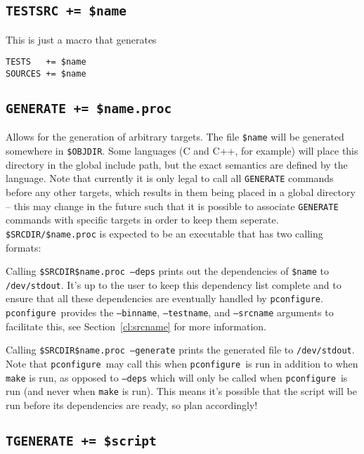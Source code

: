\documentclass{article}
\newcommand{\pconfigure}{\texttt{pconfigure}}
\begin{document}
\subsection{\texttt{TESTSRC += \$name}}

This is just a macro that generates
\begin{verbatim}
TESTS   += $name
SOURCES += $name
\end{verbatim}

\subsection{\texttt{GENERATE += \$name.proc}}

Allows for the generation of arbitrary targets.  The file
\texttt{\$name} will be generated somewhere in \texttt{\$OBJDIR}.
Some languages (C and C++, for example) will place this directory in
the global include path, but the exact semantics are defined by the
language.  Note that currently it is only legal to call all
\texttt{GENERATE} commands before any other targets, which results in
them being placed in a global directory -- this may change in the
future such that it is possible to associate \texttt{GENERATE}
commands with specific targets in order to keep them seperate.
\texttt{\$SRCDIR/\$name.proc} is expected to be an executable that has
two calling formats:

Calling \texttt{\$SRCDIR\$name.proc --deps} prints out the
dependencies of \texttt{\$name} to \texttt{/dev/stdout}.  It's up to
the user to keep this dependency list complete and to ensure that all
these dependencies are eventually handled by \pconfigure.
\pconfigure\ provides the \texttt{--binname}, \texttt{--testname}, and
\texttt{--srcname} arguments to facilitate this, see
Section~\ref{cl:srcname} for more information.

Calling \texttt{\$SRCDIR\$name.proc --generate} prints the generated
file to \texttt{/dev/stdout}.  Note that \pconfigure\ may call this
when \pconfigure\ is run in addition to when \texttt{make} is run, as
opposed to \texttt{--deps} which will only be called when
\pconfigure\ is run (and never when \texttt{make} is run).  This means
it's possible that the script will be run before its dependencies are
ready, so plan accordingly!

\subsection{\texttt{TGENERATE += \$script}}
\end{document}
